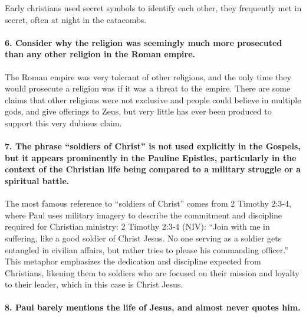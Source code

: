 Early christians used secret symbols to identify each other, they frequently met in secret, often at night in the catacombs.

\paragraph{6.
Consider why the religion was seemingly much more prosecuted than any other religion in the Roman empire.}\label{par:consider-why-the-religion-was-seemingly-much-more-prosecuted-than-any-other-religion-in-the-roman-empire.}

The Roman empire was very tolerant of other religions, and the only time they would prosecute a religion was if it was a threat to the empire.
There are some claims that other religions were not exclusive and people could believe in multiple gods, and give offerings to Zeus, but very little has ever been produced to support this very dubious claim.

\paragraph{7.
The phrase ``soldiers of Christ'' is not used explicitly in the Gospels, but it appears prominently in the Pauline Epistles, particularly in the context of the Christian life being compared to a military struggle or a spiritual battle.}\label{par:the-phrase-soldiers-of-christ-is-not-used-explicitly-in-the-gospels-but-it-appears-prominently-in-the-pauline-epistles-particularly-in-the-context-of-the-christian-life-being-compared-to-a-military-struggle-or-a-spiritual-battle.}

The most famous reference to ``soldiers of Christ'' comes from 2 Timothy 2:3-4, where Paul uses military imagery to describe the commitment and discipline required for Christian ministry: 2 Timothy 2:3-4 (NIV): ``Join with me in suffering, like a good soldier of Christ Jesus.
No one serving as a soldier gets entangled in civilian affairs, but rather tries to please his commanding officer.'' This metaphor emphasizes the dedication and discipline expected from Christians, likening them to soldiers who are focused on their mission and loyalty to their leader, which in this case is Christ Jesus.

\paragraph{8.
Paul barely mentions the life of Jesus, and almost never quotes him.}\label{par:paul-barely-mentions-the-life-of-jesus-and-almost-never-quotes-him.}

